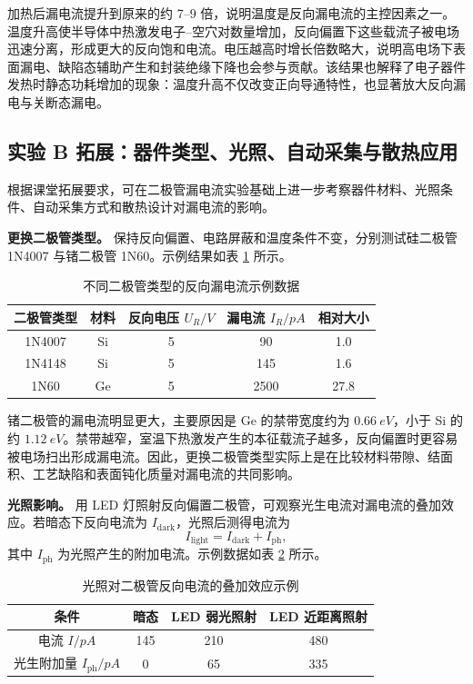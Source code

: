 \documentclass[11pt]{article}
\begin{document}
加热后漏电流提升到原来的约 7--9 倍，说明温度是反向漏电流的主控因素之一。温度升高使半导体中热激发电子--空穴对数量增加，反向偏置下这些载流子被电场迅速分离，形成更大的反向饱和电流。电压越高时增长倍数略大，说明高电场下表面漏电、缺陷态辅助产生和封装绝缘下降也会参与贡献。该结果也解释了电子器件发热时静态功耗增加的现象：温度升高不仅改变正向导通特性，也显著放大反向漏电与关断态漏电。

\subsection{实验 B 拓展：器件类型、光照、自动采集与散热应用}

根据课堂拓展要求，可在二极管漏电流实验基础上进一步考察器件材料、光照条件、自动采集方式和散热设计对漏电流的影响。

\textbf{更换二极管类型。} 保持反向偏置、电路屏蔽和温度条件不变，分别测试硅二极管 1N4007 与锗二极管 1N60。示例结果如表 \ref{tab:diode-type} 所示。

\begin{table}[H]
    \centering
    \caption{不同二极管类型的反向漏电流示例数据}
    \label{tab:diode-type}
    \begin{tabular}{ccccc}
        \toprule
        二极管类型 & 材料 & 反向电压 $U_R/\si{V}$ & 漏电流 $I_R/\si{pA}$ & 相对大小 \\
        \midrule
        1N4007 & Si & 5 & 90 & 1.0 \\
        1N4148 & Si & 5 & 145 & 1.6 \\
        1N60 & Ge & 5 & 2500 & 27.8 \\
        \bottomrule
    \end{tabular}
\end{table}

锗二极管的漏电流明显更大，主要原因是 Ge 的禁带宽度约为 $\SI{0.66}{eV}$，小于 Si 的约 $\SI{1.12}{eV}$。禁带越窄，室温下热激发产生的本征载流子越多，反向偏置时更容易被电场扫出形成漏电流。因此，更换二极管类型实际上是在比较材料带隙、结面积、工艺缺陷和表面钝化质量对漏电流的共同影响。

\textbf{光照影响。} 用 LED 灯照射反向偏置二极管，可观察光生电流对漏电流的叠加效应。若暗态下反向电流为 $I_{\mathrm{dark}}$，光照后测得电流为
\begin{equation}
    I_{\mathrm{light}}=I_{\mathrm{dark}}+I_{\mathrm{ph}},
\end{equation}
其中 $I_{\mathrm{ph}}$ 为光照产生的附加电流。示例数据如表 \ref{tab:diode-light} 所示。

\begin{table}[H]
    \centering
    \caption{光照对二极管反向电流的叠加效应示例}
    \label{tab:diode-light}
    \begin{tabular}{cccc}
        \toprule
        条件 & 暗态 & LED 弱光照射 & LED 近距离照射 \\
        \midrule
        电流 $I/\si{pA}$ & 145 & 210 & 480 \\
        光生附加量 $I_{\mathrm{ph}}/\si{pA}$ & 0 & 65 & 335 \\
        \bottomrule
    \end{tabular}
\end{table}
\end{document}
